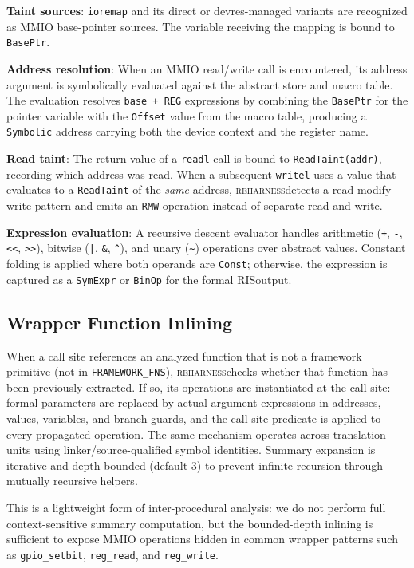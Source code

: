 \documentclass[sigconf,review]{acmart}
\newcommand{\reharness}{\textsc{reharness}}
\newcommand{\rislang}{RIS}
\begin{document}
\textbf{Taint sources}: \texttt{ioremap} and its direct or devres-managed variants are recognized as MMIO base-pointer sources. The variable receiving the mapping is bound to \texttt{BasePtr}.

\textbf{Address resolution}: When an MMIO read/write call is encountered, its address argument is symbolically evaluated against the abstract store and macro table. The evaluation resolves \texttt{base + REG} expressions by combining the \texttt{BasePtr} for the pointer variable with the \texttt{Offset} value from the macro table, producing a \texttt{Symbolic} address carrying both the device context and the register name.

\textbf{Read taint}: The return value of a \texttt{readl} call is bound to \texttt{ReadTaint(addr)}, recording which address was read. When a subsequent \texttt{writel} uses a value that evaluates to a \texttt{ReadTaint} of the \textit{same} address, \reharness detects a read-modify-write pattern and emits an \texttt{RMW} operation instead of separate read and write.

\textbf{Expression evaluation}: A recursive descent evaluator handles arithmetic (\texttt{+}, \texttt{-}, \texttt{<<}, \texttt{>>}), bitwise (\texttt{|}, \texttt{\&}, \texttt{\^{}}), and unary (\texttt{\~{}}) operations over abstract values. Constant folding is applied where both operands are \texttt{Const}; otherwise, the expression is captured as a \texttt{SymExpr} or \texttt{BinOp} for the formal \rislang output.

\subsection{Wrapper Function Inlining}

When a call site references an analyzed function that is not a framework primitive (not in \texttt{FRAMEWORK\_FNS}), \reharness checks whether that function has been previously extracted. If so, its operations are instantiated at the call site: formal parameters are replaced by actual argument expressions in addresses, values, variables, and branch guards, and the call-site predicate is applied to every propagated operation. The same mechanism operates across translation units using linker/source-qualified symbol identities. Summary expansion is iterative and depth-bounded (default 3) to prevent infinite recursion through mutually recursive helpers.

This is a lightweight form of inter-procedural analysis: we do not perform full context-sensitive summary computation, but the bounded-depth inlining is sufficient to expose MMIO operations hidden in common wrapper patterns such as \texttt{gpio\_setbit}, \texttt{reg\_read}, and \texttt{reg\_write}.
\end{document}
